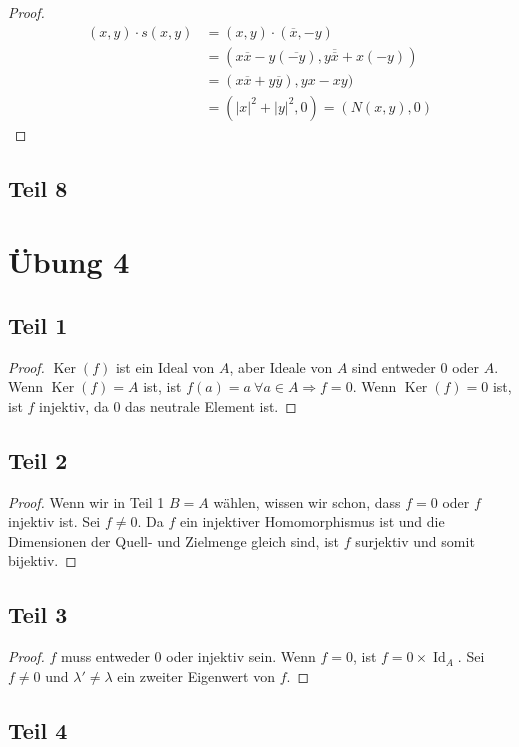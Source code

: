 \documentclass[10pt,a4paper]{article}
\DeclareMathOperator{\Ker}{Ker}
\DeclareMathOperator{\Id}{Id}
\begin{document}
\begin{proof}
\begin{align*}
(x, y) \cdot s(x, y) & = (x, y) \cdot (\overline{x}, -y)\\
& = (x\overline{x} - y(\overline{-y}), y\overline{\overline{x}} + x(-y))\\
& = (x\overline{x} + y\overline{y}), yx - xy)\\
& = (|x|^{2} + |y|^{2}, 0) = (N(x, y), 0)
\end{align*}
\end{proof}

\subsection*{Teil 8}



\section*{Übung 4}

\subsection*{Teil 1}

\begin{proof}
$\Ker(f)$ ist ein Ideal von $A$, aber Ideale von $A$ sind entweder $0$ oder $A$.
Wenn $\Ker(f) = A$ ist, ist $f(a) = a\ \forall a \in A \Rightarrow f = 0$.
Wenn $\Ker(f) = 0$ ist, ist $f$ injektiv, da $0$ das neutrale Element ist.
\end{proof}

\subsection*{Teil 2}

\begin{proof}
Wenn wir in Teil 1 $B = A$ wählen, wissen wir schon, dass $f = 0$ oder $f$ injektiv ist.
Sei $f \ne 0$.
Da $f$ ein injektiver Homomorphismus ist und die Dimensionen der Quell- und Zielmenge gleich sind, ist $f$ surjektiv und somit bijektiv.
\end{proof}

\subsection*{Teil 3}

\begin{proof}
$f$ muss entweder $0$ oder injektiv sein.
Wenn $f = 0$, ist $f = 0 \times \Id_{A}$.
Sei $f \ne 0$ und $\lambda' \ne \lambda$ ein zweiter Eigenwert von $f$.
\end{proof}

\subsection*{Teil 4}
\end{document}

